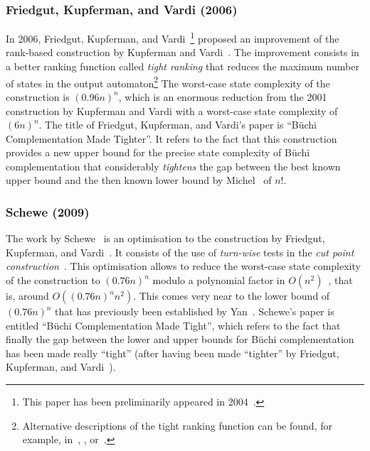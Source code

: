 \subsubsection{Friedgut, Kupferman, and Vardi (2006)}
\label{2_fkv06}
In 2006, Friedgut, Kupferman, and Vardi~\cite{friedgut2006buchi}\footnote{This paper has been preliminarily appeared in 2004~\cite{2004_friedgut}.} proposed an improvement of the rank-based construction by Kupferman and Vardi~\cite{Kupferman:2001}. The improvement consists in a better ranking function called \textit{tight ranking} that reduces the maximum number of states in the output automaton\footnote{Alternative descriptions of the tight ranking function can be found, for example, in~\cite{fogarty2013unifying}, \cite{schewe2009buchi}, or~\cite{2007_vardi}.} The worst-case state complexity of the construction is $(0.96n)^n$, which is an enormous reduction from the 2001 construction by Kupferman and Vardi with a worst-case state complexity of $(6n)^n$. The title of Friedgut, Kupferman, and Vardi's paper is ``Büchi Complementation Made Tighter''. It refers to the fact that this construction provides a new upper bound for the precise state complexity of Büchi complementation that considerably \textit{tightens} the gap between the best known upper bound and the then known lower bound by Michel~\cite{michel1988} of $n!$.



\subsubsection{Schewe (2009)}
\label{2_schewe09}
The work by Schewe~\cite{schewe2009buchi} is an optimisation to the construction by Friedgut, Kupferman, and Vardi~\cite{friedgut2006buchi}. It consists of the use of \textit{turn-wise} tests in the \textit{cut point construction}~\cite{schewe2009buchi}. This optimisation allows to reduce the worst-case state complexity of the construction to $(0.76n)^n$ modulo a polynomial factor in $O(n^2)$~\cite{schewe2009buchi}, that is, around $O((0.76n)^nn^2)$. This comes very near to the lower bound of $(0.76n)^n$ that has previously been established by Yan~\cite{2006_yan,DBLP:journals/corr/abs-0802-1226}. Schewe's paper is entitled ``Büchi Complementation Made Tight'', which refers to the fact that finally the gap between the lower and upper bounds for Büchi complementation has been made really ``tight'' (after having been made ``tighter'' by Friedgut, Kupferman, and Vardi~\cite{friedgut2006buchi}).

